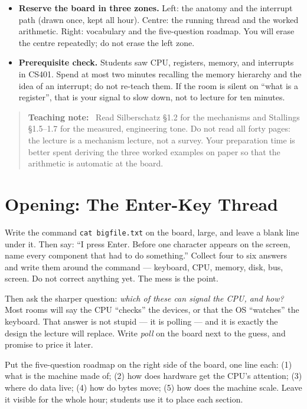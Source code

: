 \documentclass[11pt]{article}
\newenvironment{teachingaside}{\begin{quote}\small\color{primary-gold}\textbf{Teaching note:}\ }{\end{quote}}
\begin{document}
\begin{itemize}
  \item \textbf{Reserve the board in three zones.} Left: the anatomy and the
    interrupt path (drawn once, kept all hour). Centre: the running thread and
    the worked arithmetic. Right: vocabulary and the five-question roadmap. You
    will erase the centre repeatedly; do not erase the left zone.
  \item \textbf{Prerequisite check.} Students saw CPU, registers, memory, and
    interrupts in CS401. Spend at most two minutes recalling the memory
    hierarchy and the idea of an interrupt; do not re-teach them. If the room is
    silent on ``what is a register'', that is your signal to slow down, not to
    lecture for ten minutes.
\end{itemize}

\begin{teachingaside}
Read Silberschatz \S1.2 for the mechanisms and Stallings \S1.5--1.7 for the
measured, engineering tone. Do not read all forty pages: the lecture is a
mechanism lecture, not a survey. Your preparation time is better spent deriving
the three worked examples on paper so that the arithmetic is automatic at the
board.
\end{teachingaside}

\section{Opening: The Enter-Key Thread}

Write the command \texttt{cat bigfile.txt} on the board, large, and leave a
blank line under it. Then say: ``I press Enter. Before one character appears on
the screen, name every component that had to do something.'' Collect four to six
answers and write them around the command --- keyboard, CPU, memory, disk, bus,
screen. Do not correct anything yet. The mess is the point.

Then ask the sharper question: \emph{which of these can signal the CPU, and
how?} Most rooms will say the CPU ``checks'' the devices, or that the OS
``watches'' the keyboard. That answer is not stupid --- it is polling --- and it
is exactly the design the lecture will replace. Write \emph{poll} on the board
next to the guess, and promise to price it later.

Put the five-question roadmap on the right side of the board, one line each:
(1) what is the machine made of; (2) how does hardware get the CPU's attention;
(3) where do data live; (4) how do bytes move; (5) how does the machine scale.
Leave it visible for the whole hour; students use it to place each section.
\end{document}
